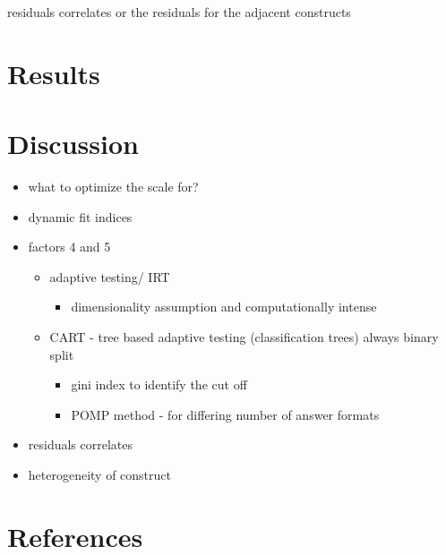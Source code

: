 \documentclass[
  12pt,
  a4paper,
  twoside]{article}
\providecommand{\tightlist}{%
  \setlength{\itemsep}{0pt}\setlength{\parskip}{0pt}}
\begin{document}
residuals
correlates or the residuals for the adjacent constructs

\hypertarget{results}{%
\section{Results}\label{results}}

\hypertarget{discussion}{%
\section{Discussion}\label{discussion}}

\begin{itemize}
\tightlist
\item
  what to optimize the scale for?
\item
  dynamic fit indices
\item
  factors 4 and 5

  \begin{itemize}
  \tightlist
  \item
    adaptive testing/ IRT

    \begin{itemize}
    \tightlist
    \item
      dimensionality assumption and computationally intense
    \end{itemize}
  \item
    CART - tree based adaptive testing (classification trees) always binary split

    \begin{itemize}
    \tightlist
    \item
      gini index to identify the cut off
    \item
      POMP method - for differing number of answer formats
    \end{itemize}
  \end{itemize}
\item
  residuals correlates
\item
  heterogeneity of construct
\end{itemize}

\hypertarget{references}{%
\section*{References}\label{references}}
\end{document}
